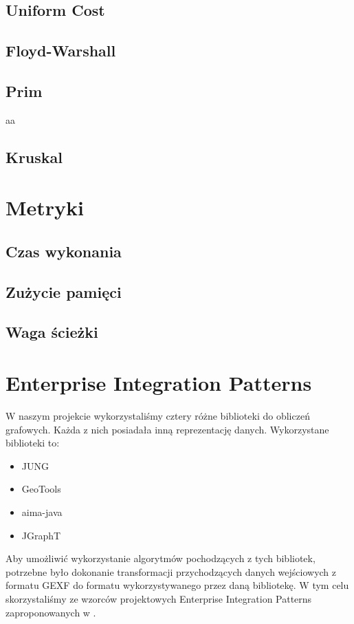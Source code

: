 \subsection{Uniform Cost}

\subsection{Floyd-Warshall}

\subsection{Prim}
aa

\subsection{Kruskal}

\section{Metryki}

\subsection{Czas wykonania}

\subsection{Zużycie pamięci}

\subsection{Waga ścieżki}

\section{Enterprise Integration Patterns}
W naszym projekcie wykorzystaliśmy cztery różne biblioteki do obliczeń grafowych. 
Każda z nich posiadała inną reprezentację danych. Wykorzystane biblioteki to:

\begin{itemize}
 \item JUNG
 \item GeoTools
 \item aima-java
 \item JGraphT
\end{itemize}

Aby umożliwić wykorzystanie algorytmów pochodzących z tych bibliotek, potrzebne było dokonanie transformacji przychodzących danych wejściowych z
formatu GEXF do formatu wykorzystywanego przez daną bibliotekę.
W tym celu skorzystaliśmy ze wzorców projektowych Enterprise Integration Patterns zaproponowanych w \cite{hohpe2004enterprise}.

